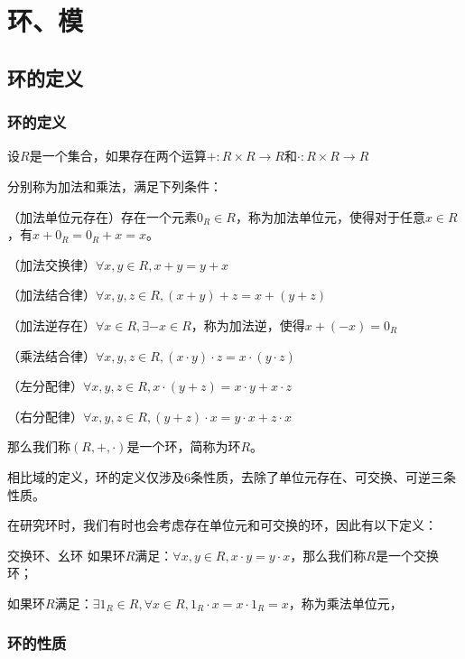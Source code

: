 \documentclass[12pt, a4paper, oneside, UTF8]{ctexbook}
\begin{document}
% 
\else
\fi
\chapter{环、模}
	\section{环的定义}
		\subsection{环的定义}
			\begin{defn}{}
				设$R$是一个集合，如果存在两个运算$+ : R \times R \rightarrow R$和$\cdot : R \times R \rightarrow R$

				分别称为加法和乘法，满足下列条件：

				 （加法单位元存在）存在一个元素$0_R \in R$，称为加法单位元，使得对于任意$x \in R$，有$x + 0_R = 0_R + x = x$。

				 （加法交换律）$\forall x, y \in R,x + y = y + x$

				 （加法结合律）$\forall x, y, z \in R,(x + y) + z = x + (y + z)$

				 （加法逆存在）$\forall x \in R,\exists -x \in R$，称为加法逆，使得$x + (-x) = 0_R$

				 （乘法结合律）$\forall x, y, z \in R,(x \cdot y) \cdot z = x \cdot (y \cdot z)$

				 （左分配律）$\forall x, y, z \in R,x \cdot (y + z) = x \cdot y + x \cdot z$
							
							（右分配律）$\forall x, y, z \in R,(y + z) \cdot x = y \cdot x + z \cdot x$

				那么我们称$(R,+,\cdot)$是一个环，简称为环$R$。
			\end{defn}
			相比域的定义，环的定义仅涉及6条性质，去除了单位元存在、可交换、可逆三条性质。

			在研究环时，我们有时也会考虑存在单位元和可交换的环，因此有以下定义：
			\begin{defn}{交换环、幺环}{}
				如果环$R$满足：$\forall x,y \in R,x \cdot y = y \cdot x$，那么我们称$R$是一个交换环；

				如果环$R$满足：$\exists 1_R \in R,\forall x \in R,1_R \cdot x = x \cdot 1_R = x$，称为乘法单位元，
			\end{defn}
		\subsection{环的性质}
\end{document}
